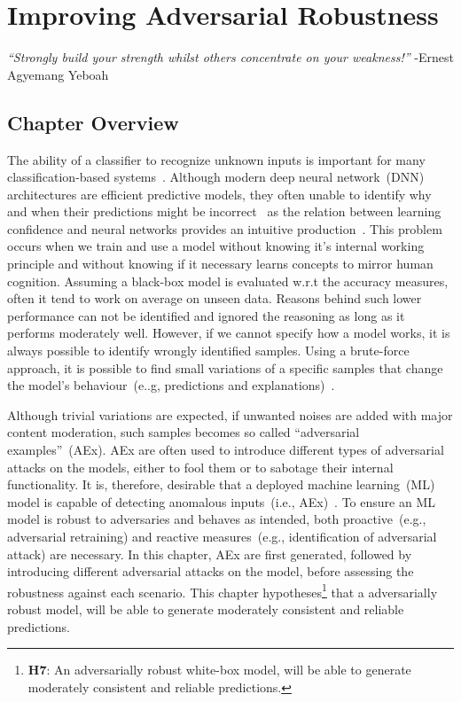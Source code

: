 \chapter{Improving Adversarial Robustness} \label{chapter:robustness}
\textit{``Strongly build your strength whilst others concentrate on your weakness!''} -Ernest Agyemang Yeboah 

\section{Chapter Overview}
The ability of a classifier to recognize unknown inputs is important for many classification-based systems~\cite{OOD15}. Although modern deep neural network~(DNN) architectures are efficient predictive models, they often unable to identify why and when their predictions might be incorrect~\cite{OOD3} as the relation between learning confidence and neural networks provides an intuitive production~\cite{OOD3}. This problem occurs when we train and use a model without knowing it's internal working principle and without knowing if it necessary learns concepts to mirror human cognition. Assuming a black-box model is evaluated w.r.t the accuracy measures, often it tend to work on average on unseen data. Reasons behind such lower performance can not be identified and ignored the reasoning as long as it performs moderately well. 
However, if we cannot specify how a model works, it is always possible to identify wrongly identified samples. Using a brute-force approach, it is possible to find small variations of a specific samples that change the model’s behaviour~(e..g, predictions and explanations)~\cite{RobustnessNotEnough}. 

\hspace*{3.5mm} Although trivial variations are expected, if unwanted noises are added with major content moderation, such samples becomes so called ``adversarial examples''~(AEx). AEx are often used to introduce different types of adversarial attacks on the models, either to fool them or to sabotage their internal functionality. It is, therefore, desirable that a deployed machine learning~(ML) model is capable of detecting anomalous inputs~(i.e., AEx)~\cite{OOD5}. To ensure an ML model is robust to adversaries and behaves as intended, both proactive~(e.g., adversarial retraining) and reactive measures~(e.g., identification of adversarial attack) are necessary. In this chapter, AEx are first generated, followed by introducing different adversarial attacks on the model,
before assessing the robustness against each scenario. This chapter hypotheses\footnote{\textbf{H7}: An adversarially robust white-box model, will be able to generate moderately consistent and reliable predictions.} that a adversarially robust model, will be able to generate moderately consistent and reliable predictions. 

